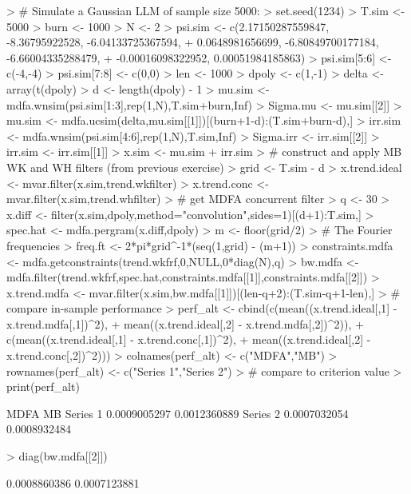 \documentclass[a4paper]{book}
\begin{document}
\begin{Schunk}
\begin{Sinput}
> # Simulate a Gaussian LLM  of sample size 5000:
> set.seed(1234)
> T.sim <- 5000
> burn <- 1000
> N <- 2
> psi.sim <- c(2.17150287559847, -8.36795922528, -6.04133725367594, 
+              0.0648981656699, -6.80849700177184, -6.66004335288479, 
+              -0.00016098322952, 0.00051984185863)
> psi.sim[5:6] <- c(-4,-4)
> psi.sim[7:8] <- c(0,0)
> len <- 1000
> dpoly <- c(1,-1)
> delta <- array(t(dpoly) %
> d <- length(dpoly) - 1
> mu.sim <- mdfa.wnsim(psi.sim[1:3],rep(1,N),T.sim+burn,Inf)
> Sigma.mu <- mu.sim[[2]]
> mu.sim <- mdfa.ucsim(delta,mu.sim[[1]])[(burn+1-d):(T.sim+burn-d),]
> irr.sim <- mdfa.wnsim(psi.sim[4:6],rep(1,N),T.sim,Inf)
> Sigma.irr <- irr.sim[[2]]
> irr.sim <- irr.sim[[1]] 
> x.sim <- mu.sim + irr.sim
> # construct and apply MB WK and WH filters (from previous exercise)
> grid <- T.sim - d
> x.trend.ideal <- mvar.filter(x.sim,trend.wkfilter)
> x.trend.conc <- mvar.filter(x.sim,trend.whfilter)
> # get MDFA concurrent filter
> q <- 30
> x.diff <- filter(x.sim,dpoly,method="convolution",sides=1)[(d+1):T.sim,]
> spec.hat <- mdfa.pergram(x.diff,dpoly)
> m <- floor(grid/2)
> # The Fourier frequencies
> freq.ft <- 2*pi*grid^{-1}*(seq(1,grid) - (m+1))
> constraints.mdfa <- mdfa.getconstraints(trend.wkfrf,0,NULL,0*diag(N),q)
> bw.mdfa <- mdfa.filter(trend.wkfrf,spec.hat,constraints.mdfa[[1]],constraints.mdfa[[2]])
> x.trend.mdfa <- mvar.filter(x.sim,bw.mdfa[[1]])[(len-q+2):(T.sim-q+1-len),]
> # compare in-sample performance
> perf_alt <- cbind(c(mean((x.trend.ideal[,1] - x.trend.mdfa[,1])^2),
+ 	mean((x.trend.ideal[,2] - x.trend.mdfa[,2])^2)),
+   c(mean((x.trend.ideal[,1] - x.trend.conc[,1])^2),
+ 	mean((x.trend.ideal[,2] - x.trend.conc[,2])^2)))
> colnames(perf_alt) <- c("MDFA","MB")
> rownames(perf_alt) <- c("Series 1","Series 2")
> # compare to criterion value
> print(perf_alt)
\end{Sinput}
\begin{Soutput}
                 MDFA           MB
Series 1 0.0009005297 0.0012360889
Series 2 0.0007032054 0.0008932484
\end{Soutput}
\begin{Sinput}
> diag(bw.mdfa[[2]])
\end{Sinput}
\begin{Soutput}
[1] 0.0008860386 0.0007123881
\end{Soutput}
\end{Schunk}
\end{document}
